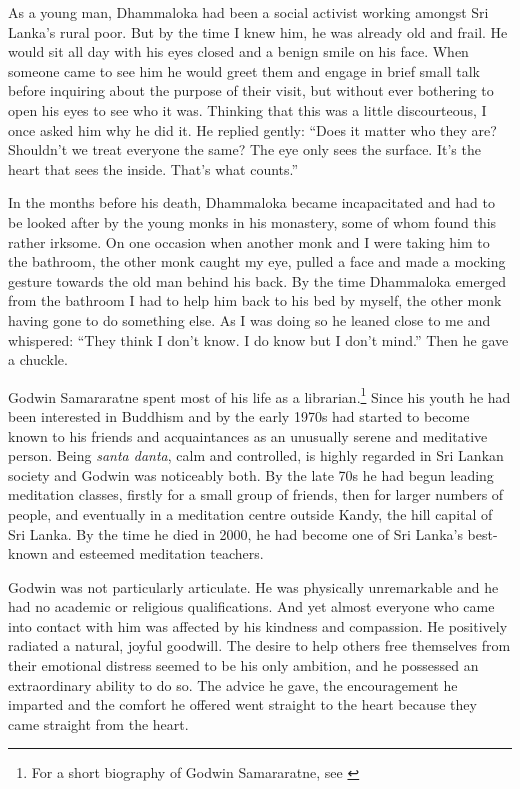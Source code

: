 \documentclass[10pt, openright]{book}
\begin{document}
As a young man, Dhammaloka had been a social activist working amongst Sri Lanka’s rural poor. But by the time I knew him, he was already old and frail. He would sit all day with his eyes closed and a benign smile on his face. When someone came to see him he would greet them and engage in brief small talk before inquiring about the purpose of their visit, but without ever bothering to open his eyes to see who it was. Thinking that this was a little discourteous, I once asked him why he did it. He replied gently: “Does it matter who they are? Shouldn’t we treat everyone the same? The eye only sees the surface. It’s the heart that sees the inside. That’s what counts.”


In the months before his death, Dhammaloka became incapacitated and had to be looked after by the young monks in his monastery, some of whom found this rather irksome. On one occasion when another monk and I were taking him to the bathroom, the other monk caught my eye, pulled a face and made a mocking gesture towards the old man behind his back. By the time Dhammaloka emerged from the bathroom I had to help him back to his bed by myself, the other monk having gone to do something else. As I was doing so he leaned close to me and whispered: “They think I don’t know. I do know but I don’t mind.” Then he gave a chuckle.


Godwin Samararatne spent most of his life as a librarian.\footnote {For a short biography of Godwin Samararatne, see \cite{Samararatne 2007}} Since his youth he had been interested in Buddhism and by the early 1970s had started to become known to his friends and acquaintances as an unusually serene and meditative person. Being \textit{santa danta}, calm and controlled, is highly regarded in Sri Lankan society and Godwin was noticeably both. By the late 70s he had begun leading meditation classes, firstly for a small group of friends, then for larger numbers of people, and eventually in a meditation centre outside Kandy, the hill capital of Sri Lanka. By the time he died in 2000, he had become one of Sri Lanka’s best-known and esteemed meditation teachers.


Godwin was not particularly articulate. He was physically unremarkable and he had no academic or religious qualifications. And yet almost everyone who came into contact with him was affected by his kindness and compassion. He positively radiated a natural, joyful goodwill. The desire to help others free themselves from their emotional distress seemed to be his only ambition, and he possessed an extraordinary ability to do so. The advice he gave, the encouragement he imparted and the comfort he offered went straight to the heart because they came straight from the heart.
\end{document}
